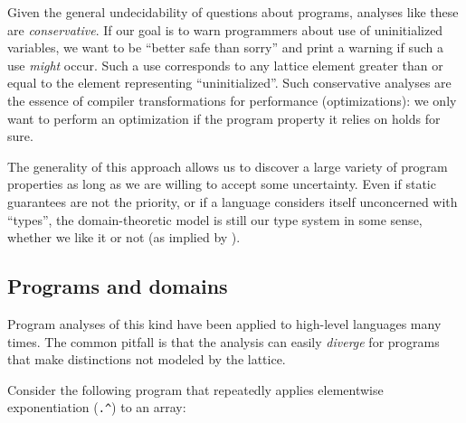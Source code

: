 Given the general undecidability of questions about programs, analyses
like these are \emph{conservative}.
If our goal is to warn programmers about use of uninitialized
variables, we want to be ``better safe than sorry'' and print a warning
if such a use \emph{might} occur.
Such a use corresponds to any lattice element greater than or equal to
the element representing ``uninitialized''.
Such conservative analyses are the essence of compiler transformations
for performance (optimizations): we only want to perform an optimization
if the program property it relies on holds for sure.

The generality of this approach
allows us to discover a large variety of program properties as long as we are
willing to accept some uncertainty.
Even if static guarantees are not the priority, or if a language considers
itself unconcerned with ``types'', the domain-theoretic model is
still our type system in some sense, whether we like it or not
(as implied by \cite{scott1976data}).


\subsection{Programs and domains}
\label{sec:programsanddomains}


Program analyses of this kind have been applied to high-level
languages many times.
The common pitfall is that the analysis can easily \emph{diverge}
for programs that make distinctions not modeled by the lattice.

Consider the following program that repeatedly applies elementwise
exponentiation (\texttt{.\^}) to an array:

